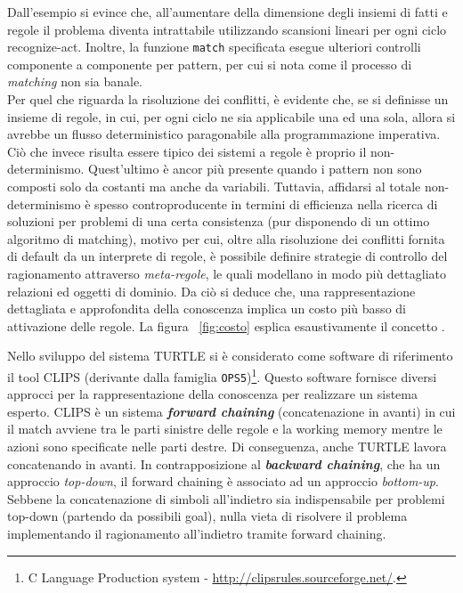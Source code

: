 Dall'esempio si evince che, all'aumentare della dimensione degli insiemi di fatti e regole il problema diventa intrattabile utilizzando scansioni lineari per ogni ciclo recognize-act. Inoltre, la funzione \verb!match! specificata esegue ulteriori controlli componente a componente per pattern, per cui si nota come il processo di \emph{matching} non sia banale.\\
Per quel che riguarda la risoluzione dei conflitti, è evidente che, se si definisse un insieme di regole, in cui, per ogni ciclo ne sia applicabile una ed una sola, allora si avrebbe un flusso deterministico paragonabile alla programmazione imperativa. Ciò che invece risulta essere tipico dei sistemi a regole è proprio il non-determinismo. Quest'ultimo è ancor più presente quando i pattern non sono composti solo da costanti ma anche da variabili. Tuttavia, affidarsi al totale non-determinismo è spesso controproducente in termini di efficienza nella ricerca di soluzioni per problemi di una certa consistenza (pur disponendo di un ottimo algoritmo di matching), motivo per cui, oltre alla risoluzione dei conflitti fornita di default da un interprete di regole, è possibile definire strategie di controllo del ragionamento attraverso \emph{meta-regole}, le quali modellano in modo più dettagliato relazioni ed oggetti di dominio. Da ciò si deduce che, una rappresentazione dettagliata e approfondita della conoscenza implica un costo più basso di attivazione delle regole. La figura ~\ref{fig:costo} esplica esaustivamente il concetto \footnotemark. 


Nello sviluppo del sistema TURTLE si è considerato come software di riferimento il tool CLIPS (derivante dalla famiglia \verb!OPS5!)\footnote{C Language Production system - \url{http://clipsrules.sourceforge.net/}.}. Questo software fornisce diversi approcci per la rappresentazione della conoscenza per realizzare un sistema esperto. CLIPS è un sistema \emph{\textbf{forward chaining}} (concatenazione in avanti) in cui il match avviene tra le parti sinistre delle regole e la working memory mentre le azioni sono specificate nelle parti destre. Di conseguenza, anche TURTLE lavora concatenando in avanti. In contrapposizione al \emph{\textbf{backward chaining}}, che ha un approccio \emph{top-down}, il forward chaining è associato ad un approccio \emph{bottom-up}. Sebbene la concatenazione di simboli all'indietro sia indispensabile per problemi top-down (partendo da possibili goal), nulla vieta di risolvere il problema implementando il ragionamento all'indietro tramite forward chaining.

